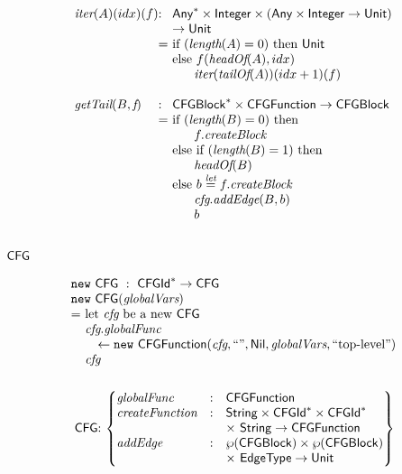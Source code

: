 \vspace*{-2em}
\[
\begin{array}{l@{}l@{~}l}
\iter(A)(idx)(f) & : & \Any^{*} \times \Integer \times (\Any \times \Integer \rightarrow \Unit)\\
&& \rightarrow \Unit\\
& = & \mbox{if}\ (\length(A) = 0)\ \mbox{then}\ \Unit \\
& & \mbox{else}\ f(\headOf(A), idx)\\
& & \phantom{else} \iter(\tailOf(A))(idx+1)(f)\\
& & \\

\getTail(B, \emph{f})\ & : & \CFGBlock^{*} \times  \CFGFunction \rightarrow \CFGBlock \\
& = & \mbox{if}\ (\length(B) = 0)\ \mbox{then}\\
& & \phantom{else} f.\emph{createBlock}\\
& & \mbox{else}\ \mbox{if}\ (\length(B) = 1)\ \mbox{then}\\
& & \phantom{else} \headOf(B) \\
& & \mbox{else}\ b \letval f.\emph{createBlock}\\
& & \phantom{else} \emph{cfg}.\emph{addEdge}(B, b)\\
& & \phantom{else} b\\
\end{array}
\]

\subsection{$\mbox{\textsf{CFG}}$}
\[
\begin{array}{l@{}l@{~}l}
\lefteqn{\new\ \CFG \ : \ \CFGId^{*} \rightarrow \CFG} \\
\lefteqn{\new\ \CFG(\emph{globalVars})}\\
& = & \text{let } \emph{cfg} \text{ be a new } \CFG\\
& & \emph{cfg}.\emph{globalFunc} \\
& & \quad \leftarrow \new\ \CFGFunction(\emph{cfg}, ``", \Nil, \emph{globalVars}, ``\text{top-level}")\\
& & \emph{cfg}\\
& & \\
\end{array}
\]
\[
\begin{array}{@{~}r@{~}l@{}l@{~}l}
& \CFG & : &
\begin{Bmatrix*}[l]
\emph{globalFunc} & : & \SF{CFGFunction}\\
\emph{createFunction} & : & \String \times \CFGId^{*} \times \CFGId^{*} \\
&&\times\ \String \rightarrow \CFGFunction \\
\emph{addEdge} & : & \powerset{\CFGBlock} \times \powerset{\CFGBlock}\\
&& \times\ \EdgeType \rightarrow \Unit
\end{Bmatrix*}
\end{array}
\]

